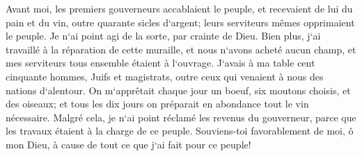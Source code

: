 \verse Avant moi, les premiers gouverneurs accablaient le peuple, et recevaient de lui du pain et du vin, outre quarante sicles d`argent; leurs serviteurs mêmes opprimaient le peuple. Je n`ai point agi de la sorte, par crainte de Dieu. 
\verse Bien plus, j`ai travaillé à la réparation de cette muraille, et nous n`avons acheté aucun champ, et mes serviteurs tous ensemble étaient à l`ouvrage. 
\verse J`avais à ma table cent cinquante hommes, Juifs et magistrats, outre ceux qui venaient à nous des nations d`alentour. 
\verse On m`apprêtait chaque jour un boeuf, six moutons choisis, et des oiseaux; et tous les dix jours on préparait en abondance tout le vin nécessaire. Malgré cela, je n`ai point réclamé les revenus du gouverneur, parce que les travaux étaient à la charge de ce peuple. 
\verse Souviens-toi favorablement de moi, ô mon Dieu, à cause de tout ce que j`ai fait pour ce peuple! 

